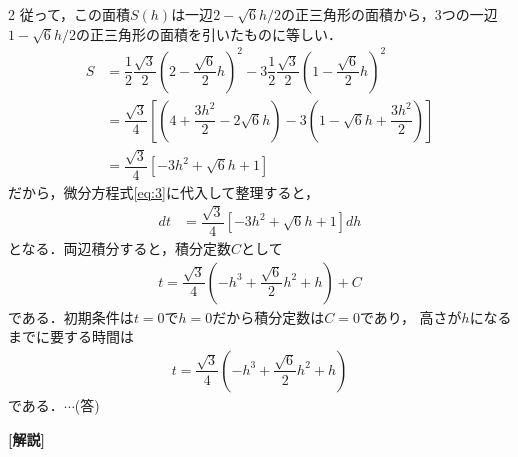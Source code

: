 \documentclass[../../main.tex]{subfiles}
\begin{document}
\begin{multicols}{2}
  従って，この面積$S(h)$は一辺$2-\sqrt{6}h/2$の正三角形の面積から，3つの一辺$1-\sqrt{6}h/2$の正三角形の面積を引いたものに等しい．
  \begin{align}
    S
    & = \dfrac{1}{2}\dfrac{\sqrt{3}}{2}\left(2-\dfrac{\sqrt{6}}{2}h\right)^2 - 3\dfrac{1}{2}\dfrac{\sqrt{3}}{2}\left(1-\dfrac{\sqrt{6}}{2}h\right)^2 \\
    & = \dfrac{\sqrt{3}}{4}\left[ \left(4+\dfrac{3h^2}{2}-2\sqrt{6}h\right) -3 \left(1-\sqrt{6}h+\dfrac{3h^2}{2}\right) \right]                   \\
    & = \dfrac{\sqrt{3}}{4}\left[ -3h^2 + \sqrt{6}h + 1 \right]
  \end{align}
  だから，微分方程式\cref{eq:3}に代入して整理すると，
  \begin{align}
    dt & = \dfrac{\sqrt{3}}{4}[-3h^2 + \sqrt{6}h+1 ] dh
  \end{align}
  となる．両辺積分すると，積分定数$C$として
  \begin{align}
    t = \dfrac{\sqrt{3}}{4} (-h^3 + \dfrac{\sqrt{6}}{2}h^2+h) + C
  \end{align}
  である．初期条件は$t=0$で$h=0$だから積分定数は$C=0$であり，
  高さが$h$になるまでに要する時間は
  \begin{align}
    t = \dfrac{\sqrt{3}}{4} \left(-h^3 + \dfrac{\sqrt{6}}{2}h^2+h\right)
  \end{align}
  である．$\cdots$(答)

  {\bf [解説]}

  \newpage
\end{multicols}
\end{document}
